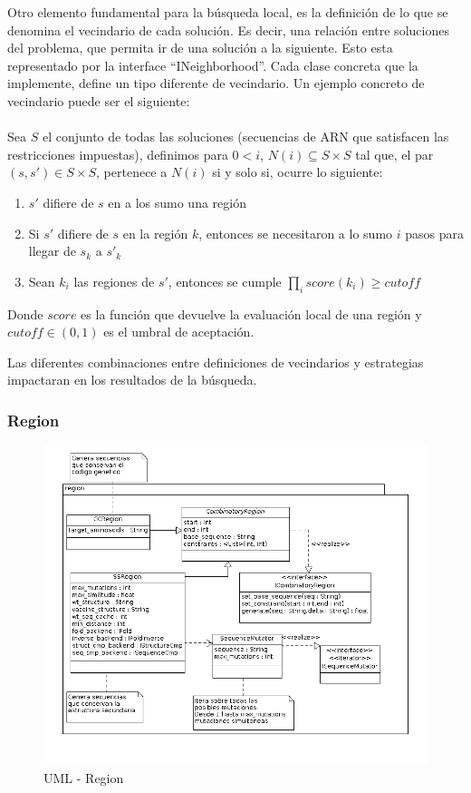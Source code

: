   Otro elemento fundamental para la b\'usqueda local, es la definici\'on de lo
que se denomina el vecindario de cada soluci\'on. Es decir, una relaci\'on entre
soluciones del problema, que permita ir de una soluci\'on a la siguiente. Esto
esta representado por la interface ``INeighborhood''. Cada clase concreta que
la implemente, define un tipo diferente de vecindario. Un ejemplo concreto de
vecindario puede ser el siguiente:
\\\\
  Sea $S$ el conjunto de todas las soluciones (secuencias de ARN que
satisfacen las restricciones impuestas), definimos para $0<i$, $N(i) \subseteq S
\times S$ tal que, el par $(s,s') \in S\times S$, pertenece a $N(i)$ si y solo
si, ocurre lo siguiente:
\begin{enumerate}
 \item $s'$ difiere de $s$ en a los sumo una regi\'on
 \item Si $s'$ difiere de $s$ en la regi\'on $k$, entonces se necesitaron a lo
sumo $i$ pasos para llegar de $s_{k}$ a $s'_{k}$
 \item Sean $k_{i}$ las regiones de $s'$, entonces se cumple $\prod_{i}
score(k_{i}) \ge cutoff$
\end{enumerate}

Donde $score$ es la funci\'on que devuelve la evaluaci\'on local de una
regi\'on y $cutoff \in (0,1)$ es el umbral de aceptaci\'on.

Las diferentes combinaciones entre definiciones de vecindarios y estrategias
impactaran en los resultados de la b\'usqueda.

  \subsubsection{Region}   
    \begin{figure}
      \centering
      \includegraphics[scale=0.5]{lld-regions.png}  
      \caption{UML - Region}
      \label{uml:lld-regions}
    \end{figure}

